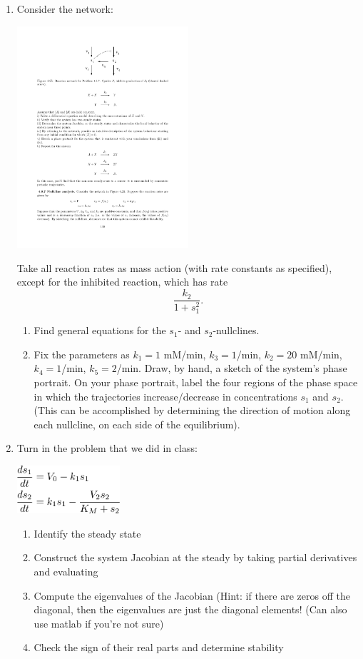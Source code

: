 \documentclass[12pt]{article}
\begin{document}
\begin{enumerate}
\item Consider the network:
\begin{center}
\includegraphics[width=2.5in]{networkhw4}
\end{center}
Take all reaction rates as mass action (with rate constants as specified), except for the inhibited reaction, which has rate 
$$\frac{k_2}{1+s_1^2}.$$
\begin{enumerate}
\item Find general equations for the $s_1$- and $s_2$-nullclines. \\
\item Fix the parameters as $k_1=1$ mM/min, $k_3=1$/min, $k_2=20$ mM/min, $k_4=1$/min, $k_5=2$/min.  Draw, by hand, a sketch of the system's phase portrait.  On your phase portrait, label the four regions of the phase space in which the trajectories increase/decrease in concentrations $s_1$ and $s_2$.  (This can be accomplished by determining the direction of motion along each nullcline, on each side of the equilibrium).
\end{enumerate}

\item Turn in the problem that we did in class:
\begin{center}
\includegraphics[width=1.5in]{classprob}
\end{center}
\begin{enumerate}
\item Identify the steady state
\item Construct the system Jacobian at the steady by taking partial derivatives and evaluating
\item Compute the eigenvalues of the Jacobian (Hint: if there are zeros off the diagonal, then the eigenvalues are just the diagonal elements! (Can also use matlab if you’re not sure)
 \item Check the sign of their real parts and determine stability
\end{enumerate}



\end{enumerate}
\end{document}
